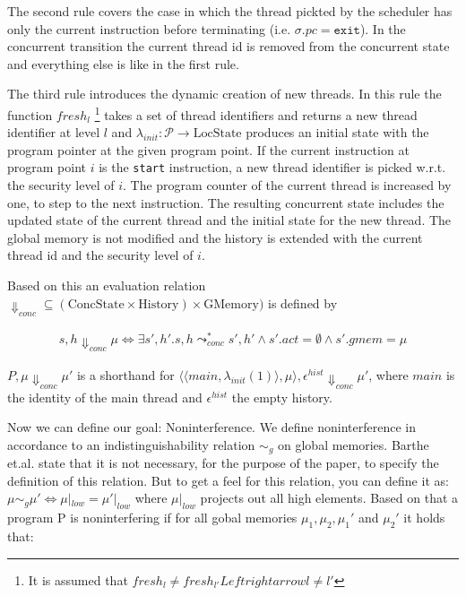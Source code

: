 \documentclass[a4paper,10pt]{llncs}
\begin{document}
The second rule covers the case in which the thread pickted by the scheduler has only the current
instruction before terminating (i.e. $\sigma.pc = \mathtt{exit}$). In the concurrent transition
the current thread id is removed from the concurrent state and everything else is like in the
first rule.

The third rule introduces the dynamic creation of new threads. In this rule the function $fresh_{l}$
\footnote{It is assumed that $fresh_l \neq fresh_{l'} Leftrightarrow l \neq l'$}
takes a set of thread identifiers and returns a new thread identifier at level $l$ and $\lambda_{init} : \mathcal{P}
\rightarrow \text{LocState}$ produces an initial state with the program pointer at the given program point.
If the current instruction at program point $i$ is the \texttt{start} instruction, a new thread
identifier is picked w.r.t. the security level of $i$. The program counter of the current thread
is increased by one, to step to the next instruction. The resulting concurrent state includes the
updated state of the current thread and the initial state for the new thread. The global memory
is not modified and the history is extended with the current thread id and the security level of $i$.

Based on this an evaluation relation $\Downarrow_{conc} \subseteq (\text{ConcState} \times \text{History}) \times
\text{GMemory})$ is defined by

\begin{align*}
s, h \Downarrow_{conc} \mu \Leftrightarrow \exists s', h'. s,h \leadsto_{conc}^* s',h' \land s'.act = \emptyset \land s'.gmem = \mu
\end{align*}

$P, \mu \Downarrow_{conc} \mu'$ is a shorthand for $\langle\langle main,\lambda_{init}(1)\rangle,
\mu\rangle, \epsilon^{hist} \Downarrow_{conc} \mu'$, where $main$ is the identity of the main thread
and $\epsilon^{hist}$ the empty history.

Now we can define our goal: Noninterference. We define noninterference
in accordance to an indistinguishability relation $\sim_g$ on global memories.
Barthe et.al. state that it is not necessary, for the purpose of the paper,
to specify the definition of this relation. But to get a feel for this
relation, you can define it as: $\mu \sim_g \mu' \Leftrightarrow \mu|_{low} =
\mu'|_{low}$ where $\mu|_{low}$ projects out all high elements. Based on that
a program P is noninterfering if for all gobal memories $\mu_1, \mu_2, \mu_1'$
and $\mu_2'$ it holds that:
\end{document}
